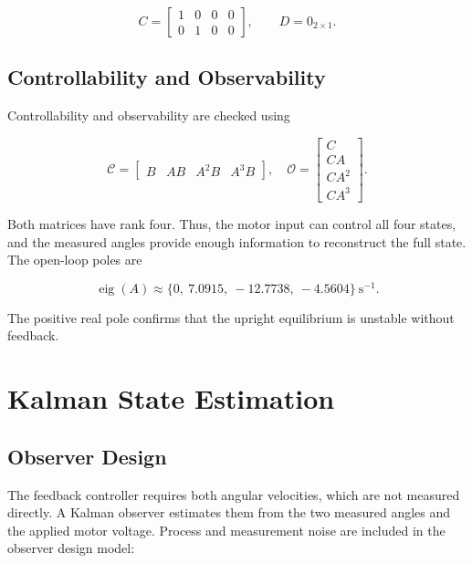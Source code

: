 \documentclass[conference]{IEEEtran}
\newcommand{\eig}{\operatorname{eig}}
\begin{document}
\begin{equation}
C=\begin{bmatrix}1&0&0&0\\0&1&0&0\end{bmatrix},\qquad D=0_{2\times1}.
\label{eq:CD}
\end{equation}

\subsection{Controllability and Observability}

Controllability and observability are checked using

\begin{equation}
\mathcal C=\begin{bmatrix}B&AB&A^2B&A^3B\end{bmatrix},\quad
\mathcal O=\begin{bmatrix}C\\CA\\CA^2\\CA^3\end{bmatrix}.
\label{eq:ranks}
\end{equation}

Both matrices have rank four. Thus, the motor input can control all four states, and the measured angles provide enough information to reconstruct the full state. The open-loop poles are

\begin{equation}
\eig(A)\approx\{0,\ 7.0915,\ -12.7738,\ -4.5604\}\ \mathrm{s}^{-1}.
\label{eq:openpoles}
\end{equation}

The positive real pole confirms that the upright equilibrium is unstable without feedback.

\section{Kalman State Estimation}

\subsection{Observer Design}

The feedback controller requires both angular velocities, which are not measured directly. A Kalman observer estimates them from the two measured angles and the applied motor voltage. Process and measurement noise are included in the observer design model:
\end{document}
